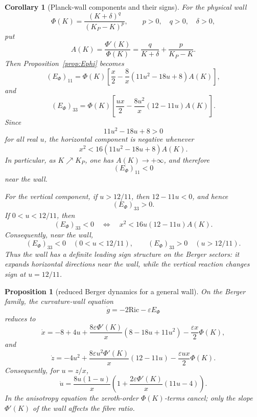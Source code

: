 \documentclass[11pt]{amsart}
\newtheorem{proposition}{Proposition}
\newtheorem{corollary}{Corollary}
\newcommand{\Ric}{\mathrm{Ric}}
\newcommand{\KP}{K_{\!P}}
\begin{document}
\begin{corollary}[Planck-wall components and their signs]\label{cor:planck-component-signs}
For the physical wall
\[
        \Phi(K)=\frac{(K+\delta)^q}{(\KP-K)^p},
        \qquad p>0,\quad q>0,\quad \delta>0,
\]
put
\[
        A(K)=\frac{\Phi'(K)}{\Phi(K)}
        =
        \frac{q}{K+\delta}
        +
        \frac{p}{\KP-K}.
\]
Then Proposition~\ref{prop:Ephi} becomes
\[
\boxed{
        (E_\Phi)_{11}
        =
        \Phi(K)
        \left[
        \frac{x}{2}
        -
        \frac{8}{x}(11u^2-18u+8)A(K)
        \right],
}
\]
and
\[
\boxed{
        (E_\Phi)_{33}
        =
        \Phi(K)
        \left[
        \frac{ux}{2}
        -
        \frac{8u^2}{x}(12-11u)A(K)
        \right].
}
\]
Since
\[
        11u^2-18u+8>0
\]
for all real \(u\), the horizontal component is negative whenever
\[
        x^2<16(11u^2-18u+8)A(K).
\]
In particular, as \(K\nearrow\KP\), one has \(A(K)\to+\infty\), and therefore
\[
        (E_\Phi)_{11}<0
\]
near the wall.

For the vertical component, if \(u>12/11\), then \(12-11u<0\), and hence
\[
        (E_\Phi)_{33}>0.
\]
If \(0<u<12/11\), then
\[
        (E_\Phi)_{33}<0
        \quad\Longleftrightarrow\quad
        x^2<16u(12-11u)A(K).
\]
Consequently, near the wall,
\[
        (E_\Phi)_{33}<0\quad (0<u<12/11),
        \qquad
        (E_\Phi)_{33}>0\quad (u>12/11).
\]
Thus the wall has a definite leading sign structure on the Berger sectors:
it expands horizontal directions near the wall, while the vertical reaction
changes sign at \(u=12/11\).
\end{corollary}


\begin{proposition}[reduced Berger dynamics for a general wall]\label{prop:berger-general-wall-ode}
On the Berger family, the curvature-wall equation
\[
        \dot g=-2\Ric-\varepsilon E_\Phi
\]
reduces to
\[
\boxed{
        \dot x
        =
        -8+4u
        +
        \frac{8\varepsilon\Phi'(K)}{x}(8-18u+11u^2)
        -
        \frac{\varepsilon x}{2}\Phi(K),
}
\]
and
\[
\boxed{
        \dot z
        =
        -4u^2
        +
        \frac{8\varepsilon u^2\Phi'(K)}{x}(12-11u)
        -
        \frac{\varepsilon ux}{2}\Phi(K).
}
\]
Consequently, for \(u=z/x\),
\[
\boxed{
        \dot u
        =
        \frac{8u(1-u)}{x}
        \left(
        1+\frac{2\varepsilon\Phi'(K)}{x}(11u-4)
        \right).
}
\]
In the anisotropy equation the zeroth-order \(\Phi(K)\)-terms cancel; only the
slope \(\Phi'(K)\) of the wall affects the fibre ratio.
\end{proposition}
\end{document}
